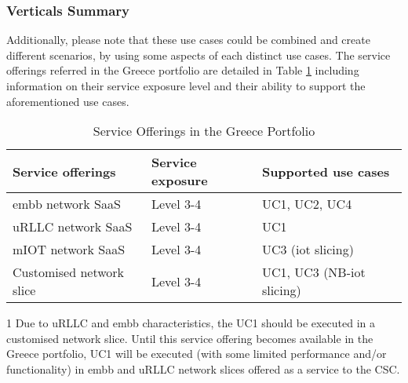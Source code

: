     \subsubsection{Verticals Summary}
    Additionally, please note that these use cases could be combined and create different scenarios, by using some aspects of each distinct use cases.
    The service offerings referred in the Greece portfolio are detailed in Table \ref{tab:service-offerings} including information on their service exposure level and their ability to support the aforementioned use cases.

    \begin{table}[!ht]
       \begin{threeparttable}
    \caption{Service Offerings in the Greece Portfolio}
    \label{tab:service-offerings}
    \setlength\tabcolsep{0pt} %
    
    \begin{tabular*}{\columnwidth}{@{\extracolsep{\fill}} lll}
    \toprule
         Service offerings & Service exposure & Supported use cases\\
    \midrule
          \acrshort{embb} network SaaS & Level 3-4 & UC1\tnote{1}, UC2, UC4 \\
    \addlinespace
         uRLLC network SaaS & Level 3-4 & UC1\tnote{1} \\
    \addlinespace
          mIOT network SaaS & Level 3-4 & UC3 (\acrshort{iot} slicing) \\
    \addlinespace
          Customised network slice & Level 3-4 & UC1\tnote{1}, UC3 (NB-\acrshort{iot} slicing) \\
    \bottomrule
    \end{tabular*}
    
    \smallskip
    \scriptsize
    
    \begin{tablenotes}
    \RaggedRight
    \item[1] Due to uRLLC and \acrshort{embb} characteristics, the UC1 should be executed in a customised network slice. Until this service offering becomes available in the Greece portfolio, UC1 will be executed (with some limited performance and/or functionality) in \acrshort{embb} and uRLLC network slices offered as a service to the CSC.
    \end{tablenotes}
       \end{threeparttable}
    \end{table}
    
